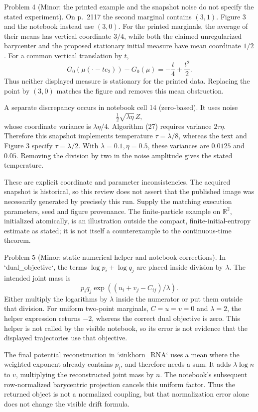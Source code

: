 \documentclass[10pt]{article}
\begin{document}
Problem 4 (Minor: the printed example and the snapshot noise do not specify the stated experiment).  On p. 2117 the second marginal contains \((3,1)\). Figure 3 and the notebook instead use \((3,0)\). For the printed marginals, the average of their means has vertical coordinate \(3/4\), while both the claimed unregularized barycenter and the proposed stationary initial measure have mean coordinate \(1/2\). For a common vertical translation by \(t\), \[G_0(\mu(\cdot-te_2))-G_0(\mu)
       =-\frac t4+\frac{t^2}{2}.\] Thus neither displayed measure is stationary for the printed data. Replacing the point by \((3,0)\) matches the figure and removes this mean obstruction.\par
A separate discrepancy occurs in notebook cell 14 (zero-based). It uses noise \[\tfrac12\sqrt{\lambda\eta}\,Z,\] whose coordinate variance is \(\lambda\eta/4\). Algorithm (27) requires variance \(2\tau\eta\). Therefore this snapshot implements temperature \(\tau=\lambda/8\), whereas the text and Figure 3 specify \(\tau=\lambda/2\). With \(\lambda=0.1,\eta=0.5\), these variances are \(0.0125\) and \(0.05\). Removing the division by two in the noise amplitude gives the stated temperature.\par
These are explicit coordinate and parameter inconsistencies. The acquired snapshot is historical, so this review does not assert that the published image was necessarily generated by precisely this run. Supply the matching execution parameters, seed and figure provenance. The finite-particle example on \(\mathbb R^2\), initialized atomically, is an illustration outside the compact, finite-initial-entropy estimate as stated; it is not itself a counterexample to the continuous-time theorem.\par
Problem 5 (Minor: static numerical helper and notebook corrections).  In `dual\_objective`, the terms \(\log p_i+\log q_j\) are placed inside division by \(\lambda\). The intended joint mass is \[p_iq_j\exp((u_i+v_j-C_{ij})/\lambda).\] Either multiply the logarithms by \(\lambda\) inside the numerator or put them outside that division. For uniform two-point marginals, \(C=u=v=0\) and \(\lambda=2\), the helper expression returns \(-2\), whereas the correct dual objective is zero. This helper is not called by the visible notebook, so its error is not evidence that the displayed trajectories use that objective.\par
The final potential reconstruction in `sinkhorn\_RNA` uses a mean where the weighted exponent already contains \(p_i\), and therefore needs a sum. It adds \(\lambda\log n\) to \(v\), multiplying the reconstructed joint mass by \(n\). The notebook’s subsequent row-normalized barycentric projection cancels this uniform factor. Thus the returned object is not a normalized coupling, but that normalization error alone does not change the visible drift formula.\par
\end{document}

